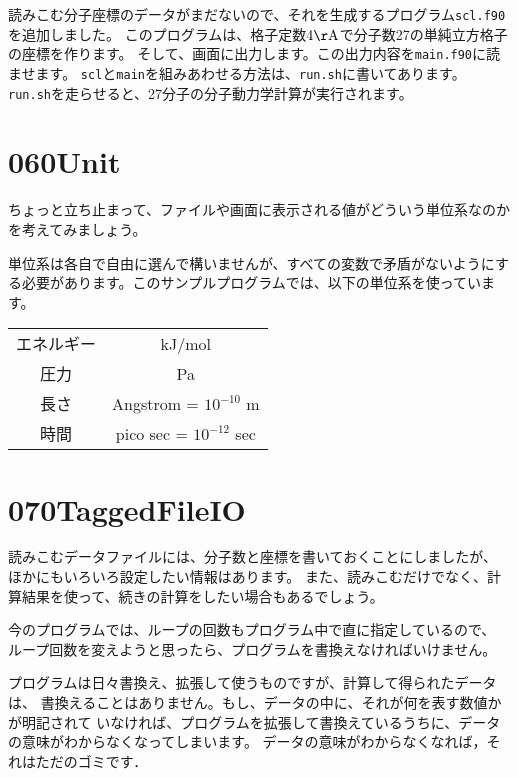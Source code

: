 \documentclass[a4,10pt]{article}
\begin{document}
読みこむ分子座標のデータがまだないので、それを生成するプログラム{\tt scl.f90}を追加しました。
このプログラムは、格子定数$4 {\rm \AA}$で分子数27の単純立方格子の座標を作ります。
そして、画面に出力します。この出力内容を{\tt main.f90}に読ませます。
{\tt scl}と{\tt main}を組みあわせる方法は、{\tt run.sh}に書いてあります。
{\tt run.sh}を走らせると、27分子の分子動力学計算が実行されます。


\section{060Unit}

ちょっと立ち止まって、ファイルや画面に表示される値がどういう単位系なのかを考えてみましょう。

単位系は各自で自由に選んで構いませんが、すべての変数で矛盾がないようにする必要があります。このサンプルプログラムでは、以下の単位系を使っています。
\begin{center}
\begin{tabular}{cc}
\hline
 エネルギー&kJ/mol\\
 圧力&Pa\\
 長さ&Angstrom = $10^{-10}$ m\\
 時間&pico sec = $10^{-12}$ sec\\
 \hline
 \end{tabular}
\end{center}

\section{070TaggedFileIO}

読みこむデータファイルには、分子数と座標を書いておくことにしましたが、
ほかにもいろいろ設定したい情報はあります。
また、読みこむだけでなく、計算結果を使って、続きの計算をしたい場合もあるでしょう。

今のプログラムでは、ループの回数もプログラム中で直に指定しているので、
ループ回数を変えようと思ったら、プログラムを書換えなければいけません。

プログラムは日々書換え、拡張して使うものですが、計算して得られたデータは、
書換えることはありません。もし、データの中に、それが何を表す数値かが明記されて
いなければ、プログラムを拡張して書換えているうちに、データの意味がわからなくなってしまいます。
データの意味がわからなくなれば，それはただのゴミです．
\end{document}
